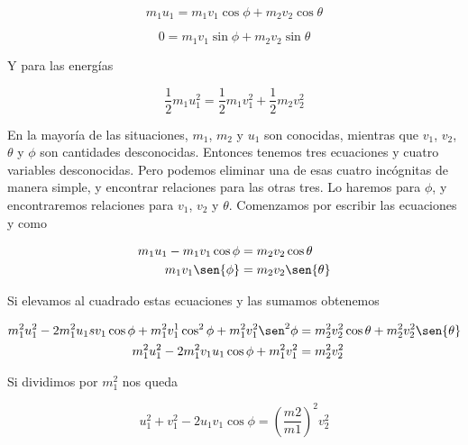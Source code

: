 \documentclass[a4paper,10pt]{article}
\numberwithin{equation}{section}
\begin{document}
\begin{equation}
%
m_1 u_1 = m_1 v_1 \cos{\phi} + m_2 v_2 \cos{\theta}
\label{eq:momentaAngulos1}
\end{equation}

\begin{equation}
0 = m_1 v_1 \sin{\phi} + m_2 v_2 \sin{\theta} 
\label{eq:momentaAngulos2}
\end{equation}

Y para las energías

\begin{equation}
 \frac{1}{2}m_1 u_1^2 = \frac{1}{2} m_1 v_1^2 + \frac{1}{2} m_2 v_2^2
 \label{eq:cineticas1}
\end{equation}

En la mayoría de las situaciones, $m_1$, $m_2$ y $u_1$ son conocidas, mientras que
$v_1$, $v_2$, $\theta$ y $\phi$ son cantidades desconocidas. Entonces tenemos tres
ecuaciones  y cuatro variables desconocidas. Pero
podemos eliminar una de esas cuatro incógnitas de manera simple, y encontrar relaciones
para las otras tres. Lo haremos para $\phi$, y encontraremos relaciones para $v_1$, 
$v_2$ y $\theta$. Comenzamos por escribir las ecuaciones  y
 como

\begin{align*}
 m_1 u_1 - m_1 v_1 \cos{\phi} &= m_2 v_2 \cos{\theta} \\
 m_1 v_1 \sen{\phi} &= m_2 v_2 \sen{\theta}
\end{align*}

Si elevamos al cuadrado estas ecuaciones y las sumamos obtenemos

\begin{align}
\begin{split}
  m_1^2 u_1^2 - 2 m_1^2 u_1 sv_1 \cos{\phi} + m_1^2 v_1^1 \cos^2{\phi} + m_1^2 v_1^2 \sen^2{\phi}
  &= m_2^2 v_2^2 \cos{\theta} + m_2^2 v_2^2 \sen{\theta} \\
  m_1^2 u_1^2 - 2 m_1^2 v_1 u_1 \cos{\phi} + m_1^2 v_1^2 &= m_2^2 v_2^2 
\end{split}
\end{align}

Si dividimos por $m_1^2$ nos queda

\begin{equation}
 u_1^2 + v_1^2 - 2 u_1 v_1 \cos{\phi} = \left(\frac{m2}{m1} \right)^2 v_2^2 
 \label{eq:velocidadesCoseno}
\end{equation}
\end{document}
